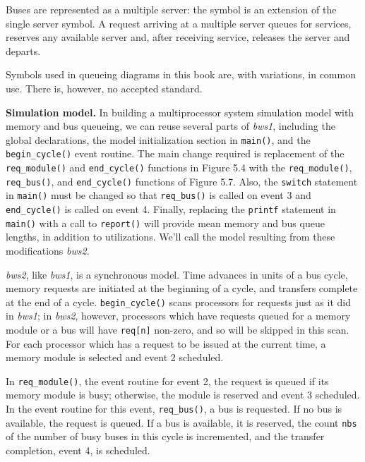 Buses are represented as a multiple server: the symbol is an extension of
the single server symbol. A request arriving at a multiple server queues for
services, reserves any available server and, after receiving service, releases
the server and departs.

Symbols used in queueing diagrams in this book are, with variations, in
common use. There is, however, no accepted standard.

\noindent\textbf{Simulation model.} In building a multiprocessor system simulation model
with memory and bus queueing, we can reuse several parts of \emph{bws1}, including
the global declarations, the model initialization section in \texttt{main()}, and the
\texttt{begin\_cycle()} event routine. The main change required is replacement of
the \texttt{req\_module()} and \texttt{end\_cycle()} functions in Figure 5.4 with the
\texttt{req\_module()}, \texttt{req\_bus()}, and \texttt{end\_cycle()} functions of Figure 5.7.
Also, the \texttt{switch} statement in \texttt{main()} must be changed so that \texttt{req\_bus()}
is called on event 3 and \texttt{end\_cycle()} is called on event 4. Finally,
replacing the \texttt{printf} statement in \texttt{main()} with a call to \texttt{report()} will
provide mean memory and bus queue lengths, in addition to utilizations.
We'll call the model resulting from these modifications \emph{bws2}.

\emph{bws2}, like \emph{bws1}, is a synchronous model. Time advances in units of a bus
cycle, memory requests are initiated at the beginning of a cycle, and transfers
complete at the end of a cycle. \texttt{begin\_cycle()} scans processors for requests
just as it did in \emph{bws1}; in \emph{bws2}, however, processors which have requests
queued for a memory module or a bus will have \texttt{req[n]} non-zero, and so will
be skipped in this scan. For each processor which has a request to be issued
at the current time, a memory module is selected and event 2 scheduled.

In \texttt{req\_module()}, the event routine for event 2, the request is queued if
its memory module is busy; otherwise, the module is reserved and event 3
scheduled. In the event routine for this event, \texttt{req\_bus()}, a bus is requested.
If no bus is available, the request is queued. If a bus is available, it is
reserved, the count \texttt{nbs} of the number of busy buses in this cycle is incremented,
and the transfer completion, event 4, is scheduled.

